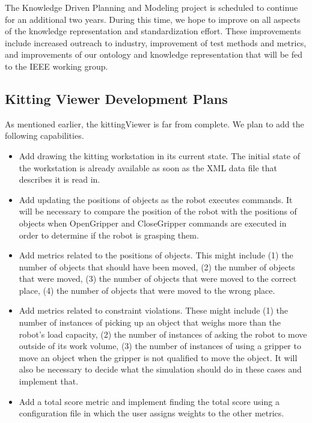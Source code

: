 The Knowledge Driven Planning and Modeling project is scheduled to continue for an additional two years. During this time,
we hope to improve on all aspects of the knowledge representation and standardization
effort. These improvements include increased outreach to industry, improvement of
test methods and metrics, and improvements of our ontology and knowledge
representation that will be fed to the IEEE working group.

\subsection{Kitting Viewer Development Plans}

As mentioned earlier, the kittingViewer is far from complete.
We plan to add the following capabilities.

\begin{itemize}

\item Add drawing the kitting workstation in its current state. The initial
  state of the workstation is already available as soon as the XML
  data file that describes it is read in.

\item Add updating the positions of objects as the robot executes commands.
  It will be necessary to compare the position of the robot with the
  positions of objects when OpenGripper and CloseGripper commands are
  executed in order to determine if the robot is grasping them.

\item Add metrics related to the positions of objects. This might include
  (1) the number of objects that should have been moved, (2) the number of
  objects that were moved, (3) the number of objects that were moved to the
  correct place, (4) the number of objects that were moved to the wrong
  place.

\item Add metrics related to constraint violations. These might include (1)
  the number of instances of picking up an object that weighs more than the
  robot's load capacity, (2) the number of instances of asking the robot to move
  outside of its work volume, (3) the number of instances of using a
  gripper to move an object when the gripper is not qualified to move the
  object. It will also be necessary to decide what the simulation should do
  in these cases and implement that.

\item Add a total score metric and implement finding the total score using
  a configuration file in which the user assigns weights to the other
  metrics.
\end{itemize} 

